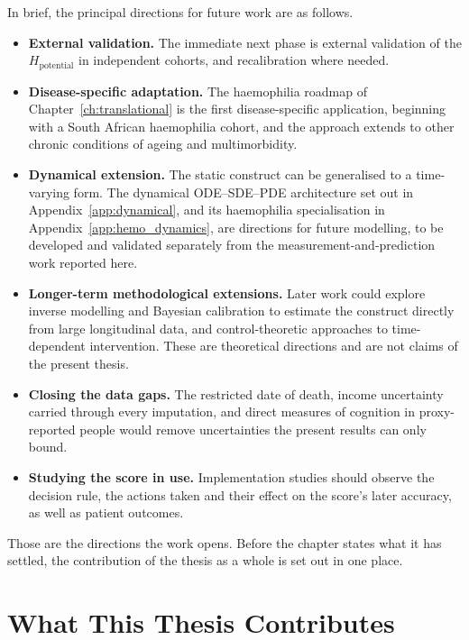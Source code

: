 In brief, the principal directions for future work are as follows.

\begin{itemize}
  \item \textbf{External validation.} The immediate next phase is external validation of the $H_{\text{potential}}$ in independent cohorts, and recalibration where needed.
  \item \textbf{Disease-specific adaptation.} The haemophilia roadmap of Chapter~\ref{ch:translational} is the first disease-specific application, beginning with a South African haemophilia cohort, and the approach extends to other chronic conditions of ageing and multimorbidity.
  \item \textbf{Dynamical extension.} The static construct can be generalised to a time-varying form. The dynamical ODE--SDE--PDE architecture set out in Appendix~\ref{app:dynamical}, and its haemophilia specialisation in Appendix~\ref{app:hemo_dynamics}, are directions for future modelling, to be developed and validated separately from the measurement-and-prediction work reported here.
  \item \textbf{Longer-term methodological extensions.} Later work could explore inverse modelling and Bayesian calibration to estimate the construct directly from large longitudinal data, and control-theoretic approaches to time-dependent intervention. These are theoretical directions and are not claims of the present thesis.
  \item \textbf{Closing the data gaps.} The restricted date of death, income uncertainty carried through every imputation, and direct measures of cognition in proxy-reported people would remove uncertainties the present results can only bound.
  \item \textbf{Studying the score in use.} Implementation studies should observe the decision rule, the actions taken and their effect on the score's later accuracy, as well as patient outcomes.
\end{itemize}

Those are the directions the work opens. Before the chapter states what it has
settled, the contribution of the thesis as a whole is set out in one place.

\section{What This Thesis Contributes}
\label{sec:disc-contributes}

